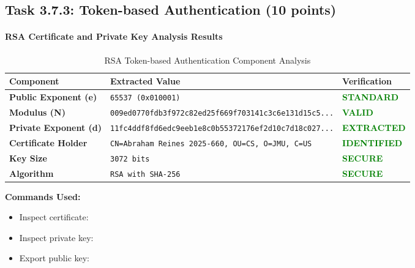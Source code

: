 \subsection{Task 3.7.3: Token-based Authentication (10 points)}


\paragraph{RSA Certificate and Private Key Analysis Results}

\begin{table}[H]
\centering
\caption{RSA Token-based Authentication Component Analysis}
\label{tab:rsa-analysis}
\begin{tabularx}{\columnwidth}{@{}L{3cm}L{7cm}L{2.5cm}@{}}
\toprule
\textbf{Component} & \textbf{Extracted Value} & \textbf{Verification} \\
\midrule
{}
\textbf{Public Exponent (e)} & \texttt{65537 (0x010001)} & \textcolor{green}{\textbf{STANDARD}} \\
\textbf{Modulus (N)} & \texttt{\small 009ed0770fdb3f972c82ed25f669f703141c3c6e131d15c5...} & \textcolor{green}{\textbf{VALID}} \\
\textbf{Private Exponent (d)} & \texttt{\small 11fc4ddf8fd6edc9eeb1e8c0b55372176ef2d10c7d18c027...} & \textcolor{green}{\textbf{EXTRACTED}} \\
\textbf{Certificate Holder} & \texttt{CN=Abraham Reines 2025-660, OU=CS, O=JMU, C=US} & \textcolor{green}{\textbf{IDENTIFIED}} \\
\textbf{Key Size} & \texttt{3072 bits} & \textcolor{green}{\textbf{SECURE}} \\
\textbf{Algorithm} & \texttt{RSA with SHA-256} & \textcolor{green}{\textbf{SECURE}} \\
\bottomrule
\end{tabularx}
\end{table}

\noindent\textbf{Commands Used:}
\begin{itemize}[nosep]
  \item Inspect certificate: 
  \item Inspect private key: 
  \item Export public key: 
\end{itemize}

